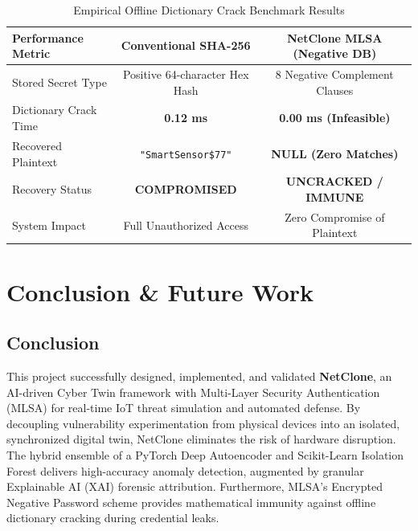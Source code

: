 \documentclass[12pt,a4paper]{report}
\begin{document}
\begin{table}[htbp]
\centering
\caption{Empirical Offline Dictionary Crack Benchmark Results}
\label{tab:empirical_bench}
\begin{tabular}{lcc}
\toprule
\textbf{Performance Metric} & \textbf{Conventional SHA-256} & \textbf{NetClone MLSA (Negative DB)} \\
\midrule
Stored Secret Type & Positive 64-character Hex Hash & 8 Negative Complement Clauses \\
Dictionary Crack Time & \textbf{0.12 ms} & \textbf{0.00 ms (Infeasible)} \\
Recovered Plaintext & \texttt{"SmartSensor\$77"} & \textbf{NULL (Zero Matches)} \\
Recovery Status & \textbf{COMPROMISED} & \textbf{UNCRACKED / IMMUNE} \\
System Impact & Full Unauthorized Access & Zero Compromise of Plaintext \\
\bottomrule
\end{tabular}
\end{table}

\chapter{Conclusion \& Future Work}

\section{Conclusion}
This project successfully designed, implemented, and validated \textbf{NetClone}, an AI-driven Cyber Twin framework with Multi-Layer Security Authentication (MLSA) for real-time IoT threat simulation and automated defense. By decoupling vulnerability experimentation from physical devices into an isolated, synchronized digital twin, NetClone eliminates the risk of hardware disruption. The hybrid ensemble of a PyTorch Deep Autoencoder and Scikit-Learn Isolation Forest delivers high-accuracy anomaly detection, augmented by granular Explainable AI (XAI) forensic attribution. Furthermore, MLSA's Encrypted Negative Password scheme provides mathematical immunity against offline dictionary cracking during credential leaks.
\end{document}
